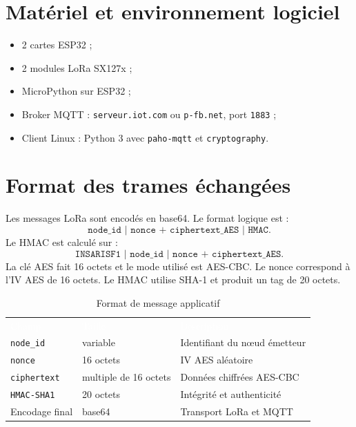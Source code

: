 \documentclass[a4paper,11pt]{report}
\begin{document}
\section{Matériel et environnement logiciel}
\begin{itemize}
    \item 2 cartes ESP32 ;
    \item 2 modules LoRa SX127x ;
    \item MicroPython sur ESP32 ;
    \item Broker MQTT : \texttt{serveur.iot.com} ou \texttt{p-fb.net}, port \texttt{1883} ;
    \item Client Linux : Python 3 avec \texttt{paho-mqtt} et \texttt{cryptography}.
\end{itemize}

\section{Format des trames échangées}
Les messages LoRa sont encodés en base64. Le format logique est :
\[
\texttt{node\_id | nonce + ciphertext\_AES | HMAC}.
\]
Le HMAC est calculé sur :
\[
\texttt{INSARISF1 | node\_id | nonce + ciphertext\_AES}.
\]
La clé AES fait 16 octets et le mode utilisé est AES-CBC. Le nonce correspond à l'IV AES de 16 octets.
Le HMAC utilise SHA-1 et produit un tag de 20 octets.

\begin{table}[H]
    \centering
    \caption{Format de message applicatif}
    \label{tab:trame}
    \begin{tabular}{lll}
        \toprule
        \rowcolor{primary} \textcolor{white}{Champ} & \textcolor{white}{Taille} & \textcolor{white}{Description} \\
        \texttt{node\_id} & variable & Identifiant du nœud émetteur \\
        \texttt{nonce} & 16 octets & IV AES aléatoire \\
        \texttt{ciphertext} & multiple de 16 octets & Données chiffrées AES-CBC \\
        \texttt{HMAC-SHA1} & 20 octets & Intégrité et authenticité \\
        Encodage final & base64 & Transport LoRa et MQTT \\
        \bottomrule
    \end{tabular}
\end{table}

\end{document}
